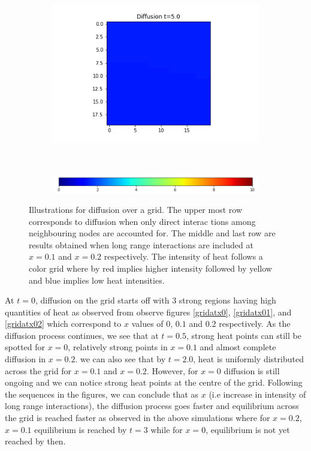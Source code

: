 \documentclass[10pt,a4paper]{article}
\begin{document}
\begin{figure}[!h]
\begin{subfigure}[b]{0.25\textwidth}
	\end{subfigure}~
	\begin{subfigure}[b]{0.25\textwidth}
		\includegraphics[width= \textwidth]{images/grid-t5-x02.png}
	\end{subfigure}\\
\vspace{0.25cm}
	 \begin{subfigure}[b]{0.60\textwidth}
	 	\includegraphics[width= \textwidth]{images/colour-bar-grid.png}
	 \end{subfigure}
\caption{Illustrations for diffusion over a grid. The upper most row corresponds to diffusion when only direct interac tions among neighbouring nodes are accounted for. The middle and last row are results obtained when long range interactions are included at $x=0.1$ and $x=0.2$ respectively. The intensity of heat follows a color grid where by red implies higher intensity followed by yellow and blue implies low heat intensities.}
\label{diffusionongrid}
\end{figure}

At $t=0$, diffusion on the grid starts off with $3$ strong regions having high quantities of heat as observed from observe figures \ref{gridatx0}, \ref{gridatx01}, and \ref{gridatx02} which correspond to $x$ values of $0$, $0.1$ and $0.2$ respectively. As the diffusion process continues, we see that at $t=0.5$, strong heat points can still be spotted for $x=0$, relatively strong points in $x=0.1$ and almost complete diffusion in $x=0.2$. we can also see that by $t=2.0$, heat is uniformly distributed across the grid for $x=0.1$ and $x=0.2$. However, for $x=0$ diffusion is still ongoing and we can notice strong heat points at the centre of the grid. Following the sequences in the figures, we can conclude that as $x$ (i.e increase in intensity of long range interactions), the diffusion process goes faster and equilibrium across the grid is reached faster as observed in the above simulations where for $x=0.2$,$x=0.1$ equilibrium is reached by $t=3$ while for $x=0$, equilibrium is not yet reached by then.
\end{document}
